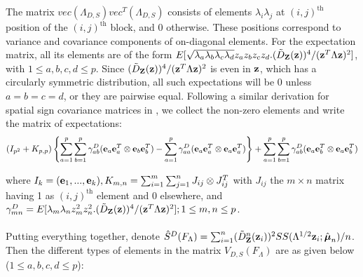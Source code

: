 \documentclass[fleqn,12pt]{article}
\begin{document}
The matrix $vec(\Lambda_{D,S}) vec^T(\Lambda_{D,S})$ consists of elements $\lambda_i\lambda_j$ at $(i,j)^\text{th}$ position of the $(i,j)^\text{th}$ block, and 0 otherwise. These positions correspond to variance and covariance components of on-diagonal elements. For the expectation matrix, all its elements are of the form $E[\sqrt{\lambda_a \lambda_b \lambda_c \lambda_d} z_a z_b z_c z_d . (\tilde D_{\mathbf{Z}} ({\bf{z}}))^4 / ({\bf{z}}^T \Lambda {\bf{z}})^2]$, with $1 \leq a,b,c,d \leq p$. Since $(\tilde D_{\mathbf{Z}} ({\bf{z}}))^4 / ({\bf{z}}^T \Lambda {\bf{z}})^2$ is even in ${\bf{z}}$, which has a circularly symmetric distribution, all such expectations will be 0 unless $a=b=c=d$, or they are pairwise equal. Following a similar derivation for spatial sign covariance matrices in \cite{magyar14}, we collect the non-zero elements and write the matrix of expectations:
$$ (I_{p^2} + K_{p,p}) \left\{ \sum_{a=1}^p \sum_{b=1}^p \gamma^D_{ab} ({\bf{e}}_a {\bf{e}}_a^T \otimes  {\bf{e}}_b {\bf{e}}_b^T) - \sum_{a=1}^p \gamma^D_{aa} ({\bf{e}}_a {\bf{e}}_a^T \otimes  {\bf{e}}_a {\bf{e}}_a^T) \right\} + \sum_{a=1}^p \sum_{b=1}^p \gamma^D_{ab} ({\bf{e}}_a {\bf{e}}_b^T \otimes  {\bf{e}}_a {\bf{e}}_b^T) $$

where $I_k = ({\bf{e}}_1,...,{\bf{e}}_k), K_{m,n} = \sum_{i=1}^m \sum_{j=1}^n J_{ij} \otimes J_{ij}^T$ with $J_{ij}$ the $m \times n$ matrix having 1 as $(i,j)^\text{th}$ element and 0 elsewhere, and $\gamma^D_{mn} = E[ \lambda_m \lambda_n z_m^2 z_n ^2 . (\tilde D_{\mathbf{Z}} ({\bf{z}}))^4 / ({\bf{z}}^T \Lambda {\bf{z}})^2]; 1 \leq m,n \leq p$.

\paragraph{}Putting everything together, denote $\hat S^D(F_\Lambda) = \sum_{i=1}^n (\tilde D^n_{\mathbf{Z}} ({\bf{z}}_i))^2 SS(\Lambda^{1/2}{\bf{z}}_i; \hat {{\boldsymbol{\mu}}}_n)/n $. Then the different types of elements in the matrix $V_{D,S}(F_\Lambda)$ are as given below ($1 \leq a,b,c,d \leq p$):
\end{document}
